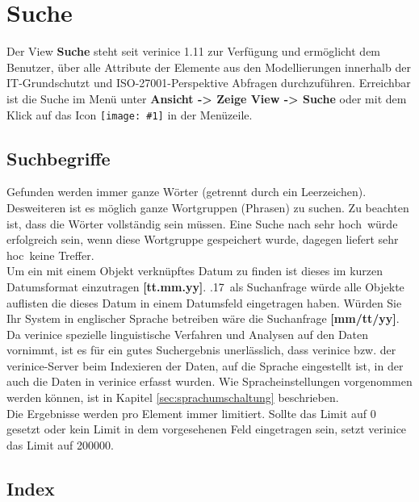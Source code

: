\documentclass[a4paper,10pt]{book}
\newcommand{\icon}[1]{\texttt{[image: \#1]}}
\begin{document}
\section{Suche}
\label{sec:suche}

Der View \textbf{Suche} steht seit verinice 1.11 zur Verfügung und
ermöglicht dem Benutzer, über alle Attribute der Elemente aus den
Modellierungen innerhalb der IT-Grundschutzt und ISO-27001-Perspektive
Abfragen durchzuführen. Erreichbar ist die Suche im Menü unter
\textbf{Ansicht -> Zeige View -> Suche} oder mit dem Klick auf das
Icon \icon{Icon/search.png} in der Menüzeile.

\subsection{Suchbegriffe}
\label{sec:suchbegriffe}

Gefunden werden immer ganze Wörter (getrennt durch ein
Leerzeichen). Desweiteren ist es möglich ganze Wortgruppen (Phrasen)
zu suchen. Zu beachten ist, dass die Wörter vollständig sein
müssen. Eine Suche nach \glqq sehr hoch\grqq\ würde erfolgreich sein,
wenn diese Wortgruppe gespeichert wurde, dagegen liefert \glqq sehr
hoc\grqq\ keine Treffer.\\

Um ein mit einem Objekt verknüpftes Datum zu finden ist dieses im kurzen 
Datumsformat einzutragen \textbf{[tt.mm.yy]}.
.17\grqq\ als Suchanfrage  würde alle Objekte auflisten die dieses
Datum in einem Datumsfeld eingetragen haben. Würden Sie Ihr System 
in englischer Sprache betreiben wäre die Suchanfrage \textbf{[mm/tt/yy]}.\\

Da verinice spezielle linguistische Verfahren und Analysen auf den
Daten vornimmt, ist es für ein gutes Suchergebnis unerlässlich, dass
verinice bzw. der verinice-Server beim Indexieren der Daten, auf die
Sprache eingestellt ist, in der auch die Daten in verinice erfasst
wurden. Wie Spracheinstellungen vorgenommen werden können, ist in
Kapitel \ref{sec:sprachumschaltung} beschrieben.\\

Die Ergebnisse werden pro Element immer limitiert. Sollte das Limit
auf 0 gesetzt oder kein Limit in dem vorgesehenen Feld eingetragen
sein, setzt verinice das Limit auf 200000.

\subsection{Index}
\label{sec:index}
\end{document}
